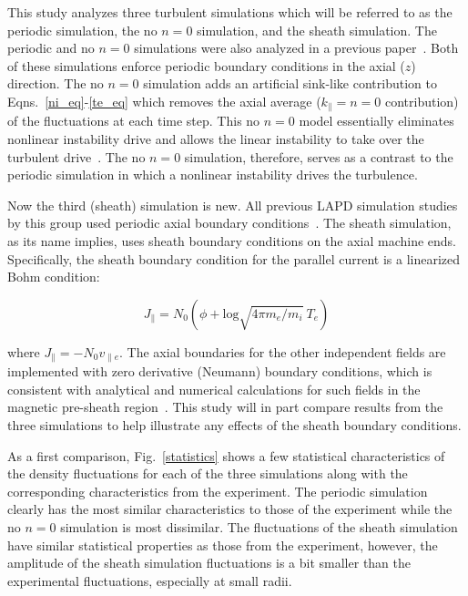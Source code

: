 \documentclass[showpacs,preprintnumbers,amsmath,amssymb,superscriptaddress,aip]{revtex4-1}
\def\beq{\begin{equation}}
\def\eeq{\end{equation}}
\def\para{\parallel}
\newcommand{\vpe}{v_{\parallel e}}
\begin{document}
This study analyzes three turbulent simulations which will be referred to as the periodic simulation, the no $n=0$ simulation, and the sheath simulation.
The periodic and no $n=0$ simulations were also analyzed in a previous paper~\cite{friedman2012b}. Both of these simulations enforce periodic boundary conditions in the axial ($z$)
direction. The no $n=0$ simulation adds an artificial sink-like contribution to Eqns.~\ref{ni_eq}-\ref{te_eq} which removes the axial average 
($k_\parallel = n = 0$ contribution) of the fluctuations at each time step. This no $n=0$ model essentially eliminates nonlinear instability drive and allows
the linear instability to take over the turbulent drive~\cite{friedman2012b}. The no $n=0$ simulation, therefore, serves as a contrast to the periodic simulation in which a nonlinear instability
drives the turbulence.

Now the third (sheath) simulation is new. 
All previous LAPD simulation studies by this group used periodic axial boundary conditions~\cite{Popovich2010a,Popovich2010b,Umansky2011,friedman2012,friedman2012b}.
The sheath simulation, as its name implies, uses sheath boundary conditions on the axial machine ends. Specifically, the sheath boundary
condition for the parallel current is a linearized Bohm condition:

\beq
\label{sheath_bndry}
J_\para = N_0 (\phi + \text{log} \sqrt{4 \pi m_e/m_i} \ T_e) 
\eeq

where $J_\para = - N_0 \vpe$. The axial boundaries for the other independent fields are implemented with zero derivative (Neumann) boundary conditions, which is consistent with
analytical and numerical calculations for such fields in the magnetic pre-sheath region~\cite{loizu2012}. 
This study will in part compare results from the three simulations to help illustrate any effects of the sheath boundary conditions.

As a first comparison, Fig.~\ref{statistics} shows a few statistical characteristics of the density fluctuations for each of the three simulations along with the corresponding
characteristics from the experiment. The periodic simulation clearly has the most similar characteristics to those of the experiment while the no $n=0$ simulation is most dissimilar.
The fluctuations of the sheath simulation have similar statistical properties as those from the experiment, however, 
the amplitude of the sheath simulation fluctuations is a bit smaller than the experimental fluctuations, especially at small radii.
\end{document}
